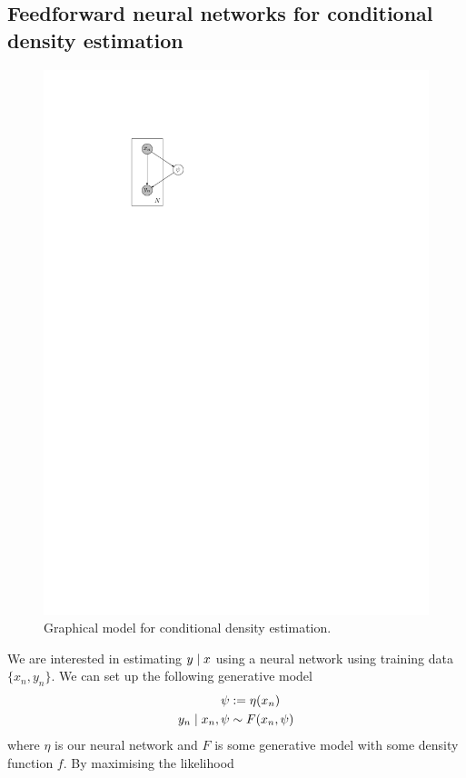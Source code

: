 \subsection{Feedforward neural networks for conditional density estimation}
\begin{figure}[htb!]
    \centering
    \includegraphics{nnets/figures/conditional-density-estimation}
    \caption{Graphical model for conditional density estimation.}
    \label{fig:nnets/feedforward/cond}
\end{figure}
We are interested in estimating $y \mid x$ using a neural network using training data $\{x_n, y_n\}$. We can set up the following generative model
\begin{align}
    \psi &:= \eta(x_n) \\
    y_n \mid x_n, \psi &\sim F(x_n, \psi)
\end{align}
where $\eta$ is our neural network and $F$ is some generative model with some density function $f$. By maximising the likelihood
